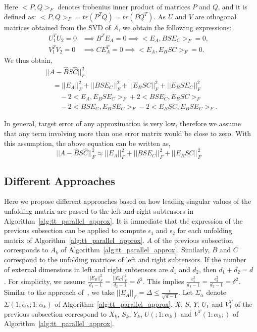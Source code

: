 \documentclass[runningheads]{llncs}
\begin{document}
\noindent Here $<P, Q>_F$ denotes frobenius inner product of matrices $P$ and $Q$, and it is defined as: $<P, Q>_F = tr(P^TQ) = tr(PQ^T)$. As $U$ and $V$ are othogonal matrices obtained from the SVD of $A$, we obtain the following expressions:
\begin{align*}
U_1^TU_2 = 0 & \implies B^TE_A = 0 \implies <E_A, BSE_C>_F = 0, \\
V_1^TV_2 = 0 & \implies CE_A^T = 0 \implies <E_A, E_BSC>_F = 0. 
\end{align*}
We thus obtain,
\begin{align*}
&||A - \hat{B} S \hat{C}||_F^2 \\
&\quad= ||E_A||_F^2 + ||BSE_C||_F^2 + ||E_BSC||_F^2 + ||E_BSE_C||_F^2 \\
&\quad\quad -2 <E_A, E_BSE_C>_F + 2 <BSE_C, E_BSC>_F\\
&\quad\quad -2 <BSE_C, E_BSE_C>_F - 2<E_BSC, E_BSE_C>_F.
\end{align*}

\noindent In general, target error of any approximation is very low, therefore we assume that any term involving more than one error matrix would be close to zero. With this assumption, the above equation can be written as,
\begin{equation*}
||A - \hat{B} S \hat{C}||_F^2 \approx ||E_A||_F^2 + ||BSE_C||_F^2 + ||E_BSC||_F^2
\end{equation*}

\subsection{Different Approaches}
\label{sec:approaches:all}
Here we propose different approaches based on how leading singular values of the unfolding matrix are passed to the left and right subtensors in Algorithm~\ref{alg:tt_parallel_approx}. It is immediate that the expression of the previous subsection can be applied to compute $\epsilon_1$ and $\epsilon_2$ for each unfolding matrix of Algorithm~\ref{alg:tt_parallel_approx}. $A$ of the previous subsection corresponds to $A_k$ of Algorithm~\ref{alg:tt_parallel_approx}. Similarly, $B$ and $C$ correspond to the unfolding matrices of left and right subtensors. If the number of external dimensions in left and right subtensors are $d_1$ and $d_2$, then $d_1 + d_2 = d$. For simplicity, we assume $\frac{||E_B||_F^2}{d_1-1} = \frac{||E_C||_F^2}{d_2-1} = \delta^2$. This implies $\frac{\epsilon_1^2}{d_1-1} = \frac{\epsilon_2^2}{d_2-1} = \delta^2$. Similar to the approach of~\cite{tt}, we take $||E_A||_F=\Delta \le \frac{\epsilon}{\sqrt{d-1}}$. Let $\Sigma_\alpha$ denote $\Sigma(1:\alpha_k;1:\alpha_k)$ of Algorithm~\ref{alg:tt_parallel_approx}. $X$, $S$, $Y$, $U_1$ and $V_1^T$ of the previous subsection correspond to $X_k$, $S_k$, $Y_k$, $U(;1:\alpha_k)$ and $V^T(1:\alpha_k;)$ of Algorithm~\ref{alg:tt_parallel_approx}. 
\end{document}
